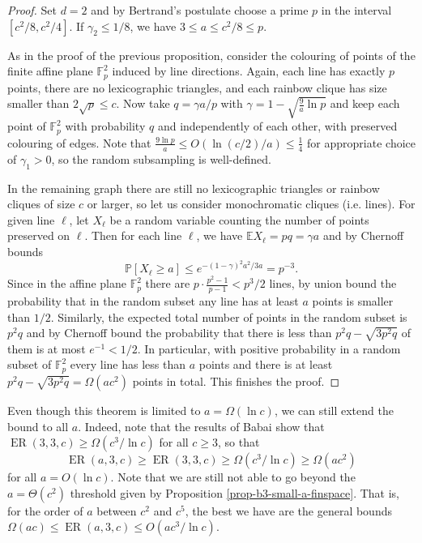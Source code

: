 \documentclass[10pt,a4paper]{article}
\theoremstyle{plain}
\theoremstyle{definition}
\newcommand{\offerado}[3]{\operatorname{ER}(#1,#2,#3)}
\newcommand{\expect}{\mathbb{E}}
\newcommand{\prob}{\mathbb{P}}
\begin{document}
\begin{proof}
    Set $d=2$ and by Bertrand's postulate choose a prime $p$ in the interval $[c^2/8, c^2/4]$. If $\gamma_2\leq 1/8$, we have $3\le a\le c^2/8\le p$.

    As in the proof of the previous proposition, consider the colouring of points of the finite affine plane $\mathbb{F}_p^2$ induced by line directions. Again, each line has exactly $p$ points, there are no lexicographic triangles, and each rainbow clique has size smaller than $2\sqrt{p}\le c$. Now take $q=\gamma a/p$ with $\gamma=1-\sqrt{\frac{9}{a}\ln p}$ and keep each point of $\mathbb{F}_p^2$ with probability $q$ and independently of each other, with preserved colouring of edges. Note that $\frac{9\ln p}{a}\le O(\ln(c/2)/a)\le\frac{1}{4}$ for appropriate choice of $\gamma_1>0$, so the random subsampling is well-defined.
    
    In the remaining graph there are still no lexicographic triangles or rainbow cliques of size $c$ or larger, so let us consider monochromatic cliques (i.e. lines). For given line $\ell$, let $X_{\ell}$ be a random variable counting the number of points preserved on $\ell$. Then for each line $\ell$, we have $\expect X_\ell=pq=\gamma a$ and by Chernoff bounds 
    $$\prob\left[ X_\ell\ge a \right]\le e^{-(1-\gamma)^2a^2/3a}=p^{-3}.$$
    Since in the affine plane $\mathbb{F}_p^2$ there are $p\cdot\frac{p^2-1}{p-1}<p^{3}/2$ lines, by union bound the probability that in the random subset any line has at least $a$ points is smaller than $1/2$. Similarly, the expected total number of points in the random subset is $p^2q$ and by Chernoff bound the probability that there is less than $p^2q-\sqrt{3p^2q}$ of them is at most $e^{-1}<1/2$. In particular, with positive probability in a random subset of $\mathbb{F}_p^2$ every line has less than $a$ points and there is at least $p^2q-\sqrt{3p^2q}=\Omega(ac^2)$ points in total. This finishes the proof.
\end{proof}

Even though this theorem is limited to $a=\Omega(\ln c)$, we can still extend the bound to all $a$. Indeed, note that the results of Babai \cite{babai1985anti} show that $\offerado{3}{3}{c}\ge \Omega(c^3/\ln c)$ for all $c\ge 3$, so that
$$\offerado{a}{3}{c}\ge \offerado{3}{3}{c}\ge \Omega(c^3/\ln c)\ge \Omega(ac^2)$$
for all $a=O(\ln c)$.  Note that we are still not able to go beyond the $a=\Theta(c^2)$ threshold given by Proposition \ref{prop-b3-small-a-finspace}. That is, for the order of $a$ between $c^2$ and $c^5$, the best we have are the general bounds $\Omega(ac)\le \offerado{a}{3}{c}\le O(ac^3/\ln c)$.
\end{document}
